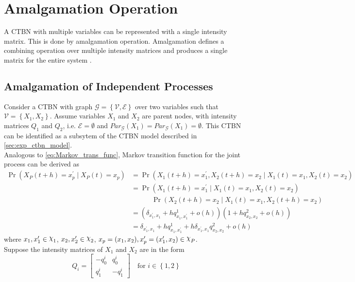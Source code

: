 %
\renewcommand{\arraystretch}{.9}
\appendixpage
\chapter{Amalgamation Operation}
\label{ap:amalgamation}
A CTBN with multiple variables can be represented with a single intensity matrix. This is done by amalgamation operation. Amalgamation defines a combining operation over multiple intensity matrices and produces a single matrix for the entire system \cite{Nodelman1995}. 

\section*{Amalgamation of Independent Processes}
Consider a CTBN with graph $ \mathcal{G} = \left\lbrace \mathcal{V}, \mathcal{E} \right\rbrace $ over two variables such that $ \mathcal{V} = \left\lbrace X_1, X_2\right\rbrace $. Assume variables $ X_1 $ and $ X_2 $ are parent nodes, with intensity matrices $ Q_1 $ and $ Q_2 $, i.e. $ \mathcal{E} = \emptyset $ and $ Par_{\mathcal{G}}(X_1) = Par_{\mathcal{G}}(X_1) = \emptyset $. This CTBN can be identified as a subsytem of the CTBN model described in \cref{sec:exp_ctbn_model}. \\
Analogous to \autoref{eq:Markov_trans_func}, Markov transition function for the joint process can be derived as
\begin{align}
	\operatorname{Pr}(X_P(t+h) = x_p^\prime\mid X_P(t) = x_p)
	&=  \operatorname{Pr}(X_1(t+h) = x_1^\prime, X_2(t+h) = x_2 \mid X_1(t) = x_1, X_2(t) = x_2)\nonumber \\
	&= \operatorname{Pr}(X_1(t+h) = x_1^\prime \mid X_1(t) = x_1, X_2(t) = x_2) \nonumber\\
	& \quad \quad \quad \operatorname{Pr}( X_2(t+h) = x_2 \mid X_1(t) = x_1, X_2(t+h) = x_2) \nonumber\\
	& = (\delta_{x_1^\prime, x_1} + hq^1_{x_1, x_1^\prime} + o(h))(1 + hq^2_{x_2, x_2} + o(h))\nonumber\\
	& = \delta_{x_1^\prime, x_1} + hq^1_{x_1, x_1^\prime} + h\delta_{x_1^\prime, x_1}q^2_{x_2, x_2} + o(h)
	\label{eq:amalg}
\end{align}
where $ x_1, x_1^\prime \in \rchi_1 $, $ x_2, x_2^\prime \in \rchi_2 $, $ x_p = (x_1, x_2), x_p^\prime = (x_1^\prime, x_2) \in \rchi_P $.\\
Suppose the intensity matrices of $ X_1 $ and $ X_2 $ are in the form
\begin{equation}
Q_i = 
\begin{bmatrix}
-q^{i}_{0} & q^{i}_{0} \\
q^{i}_{1} & -q^{i}_{1}
\end{bmatrix} \quad \text{for } i \in \left\lbrace 1,2\right\rbrace 
\end{equation}
